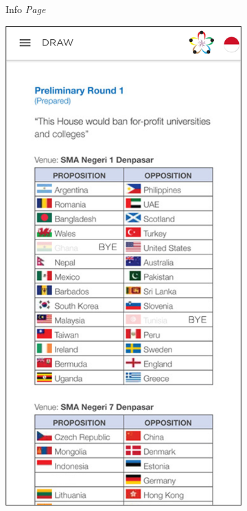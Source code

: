 \begin{figure}[H]
\begin{subfigure}[b]{0.247\textwidth}
	    \caption{Info \textit{Page}}
	    \label{fig:wsdcAppInfo}
     \end{subfigure}
	\begin{subfigure}[b]{0.247\textwidth}
    \centering
	    \includegraphics[scale=0.4]{Gambar/DrawPage.png}

\end{subfigure}
\end{figure}
